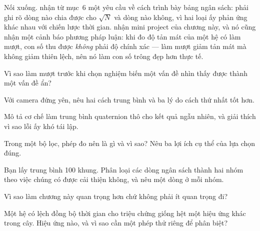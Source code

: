 \documentclass[../../marker.tex]{subfiles}
\begin{document}
Nối xuống.  nhận từ mục~6 một yêu cầu về cách trình bày bảng ngân sách: phải ghi rõ dòng nào chia được cho \(\sqrt{N}\) và dòng nào không, vì hai loại ấy phản ứng khác nhau với chiến lược thời gian.  nhận mini project của chương này, và nó cũng nhận một cảnh báo phương pháp luận: khi đo độ tản mát của một hệ có làm mượt, con số thu được \emph{không} phải độ chính xác --- làm mượt giảm tản mát mà không giảm thiên lệch, nên nó làm con số trông đẹp hơn thực tế.

\begin{tukiem}
\item Vì sao làm mượt trước khi chọn nghiệm biến một vấn đề nhìn thấy được thành một vấn đề ẩn?
\item Với camera đứng yên, nêu hai cách trung bình và ba lý do cách thứ nhất tốt hơn.
\item Mô tả cơ chế làm trung bình quaternion thô cho kết quả ngẫu nhiên, và giải thích vì sao lỗi ấy khó tái lập.
\item Trong một bộ lọc, phép đo nên là gì và vì sao? Nêu ba lợi ích cụ thể của lựa chọn đúng.
\item Bạn lấy trung bình 100 khung. Phân loại các dòng ngân sách thành hai nhóm theo việc chúng có được cải thiện không, và nêu một dòng ở mỗi nhóm.
\item Vì sao  làm chương này quan trọng hơn chứ không phải ít quan trọng đi?
\item Một hệ có lệch đồng bộ thời gian cho triệu chứng giống hệt một hiệu ứng khác trong cây. Hiệu ứng nào, và vì sao cần một phép thử riêng để phân biệt?
\end{tukiem}
\ifSubfilesClassLoaded{\printbibliography[title={Nguồn}]}{}
\end{document}
